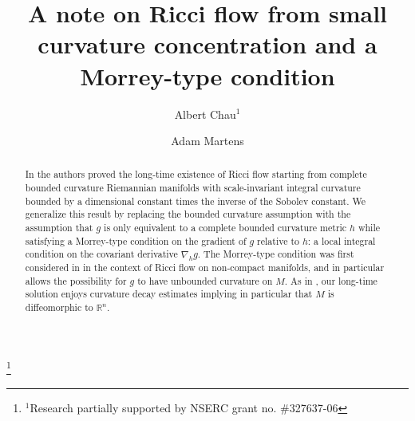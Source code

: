 \documentclass{amsart}
\theoremstyle{definition}
\begin{document}
\setlength\parindent{15pt}


\vspace{-3em}



        \author{Albert Chau$^1$}
        \address{Department of Mathematics,
                The University of British Columbia, Room 121, 1984 Mathematics
                Road, Vancouver, B.C., Canada V6T 1Z2} 




        \thanks{$^1$Research
                partially supported by NSERC grant no. \#327637-06}


        \author[A. Martens]{Adam Martens}
        \address{Department of Mathematics, The University of British Columbia,
1984 Mathematics Road, Vancouver, B.C.,  Canada V6T 1Z2}






\begin{abstract}
In \cite{ChauMartens} the authors proved the long-time existence of Ricci flow starting from complete bounded curvature Riemannian manifolds with scale-invariant integral curvature bounded by a dimensional constant times the inverse of the Sobolev constant.   We generalize this result by replacing the bounded curvature assumption with the assumption that $g$ is only equivalent to a complete bounded curvature metric $h$ while satisfying a Morrey-type condition on the gradient of $g$ relative to $h$: a local integral condition on the covariant derivative $\nabla_h g$. The Morrey-type condition was first considered in \cite{LeeLiu} in the context of Ricci flow on non-compact manifolds, and in particular allows the possibility for $g$ to have unbounded curvature on $M$.  As in \cite{ChauMartens}, our long-time solution enjoys curvature decay estimates implying in particular that  $M$ is diffeomorphic to $\mathbb{R}^n$.  


\end{abstract}



        
\title{A note on Ricci flow from small curvature concentration and a Morrey-type condition}

\maketitle
\end{document}
